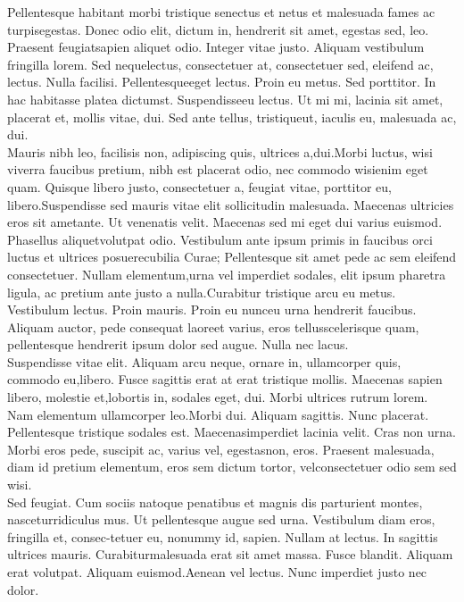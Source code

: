 \documentclass[11pt,
               a4paper,
               parskip=half,
               ]{scrartcl}
\begin{document}
 Pellentesque habitant morbi tristique senectus et netus et malesuada fames ac turpisegestas. Donec odio elit, dictum in, hendrerit sit amet, egestas sed, leo. Praesent feugiatsapien aliquet odio. Integer vitae justo. Aliquam vestibulum fringilla lorem. Sed nequelectus, consectetuer at, consectetuer sed, eleifend ac, lectus. Nulla facilisi. Pellentesqueeget lectus. Proin eu metus. Sed porttitor. In hac habitasse platea dictumst. Suspendisseeu lectus. Ut mi mi, lacinia sit amet, placerat et, mollis vitae, dui. Sed ante tellus, tristiqueut, iaculis eu, malesuada ac, dui. \\
 
 Mauris nibh leo, facilisis non, adipiscing quis, ultrices a,dui.Morbi luctus, wisi viverra faucibus pretium, nibh est placerat odio, nec commodo wisienim eget quam. Quisque libero justo, consectetuer a, feugiat vitae, porttitor eu, libero.Suspendisse sed mauris vitae elit sollicitudin malesuada. Maecenas ultricies eros sit ametante. Ut venenatis velit. Maecenas sed mi eget dui varius euismod. Phasellus aliquetvolutpat odio. Vestibulum ante ipsum primis in faucibus orci luctus et ultrices posuerecubilia Curae; Pellentesque sit amet pede ac sem eleifend consectetuer. Nullam elementum,urna vel imperdiet sodales, elit ipsum pharetra ligula, ac pretium ante justo a nulla.Curabitur tristique arcu eu metus. Vestibulum lectus. Proin mauris. Proin eu nunceu urna hendrerit faucibus. Aliquam auctor, pede consequat laoreet varius, eros tellusscelerisque quam, pellentesque hendrerit ipsum dolor sed augue. Nulla nec lacus.\\
 
 Suspendisse vitae elit. Aliquam arcu neque, ornare in, ullamcorper quis, commodo eu,libero. Fusce sagittis erat at erat tristique mollis. Maecenas sapien libero, molestie et,lobortis in, sodales eget, dui. Morbi ultrices rutrum lorem. Nam elementum ullamcorper leo.Morbi dui. Aliquam sagittis. Nunc placerat. Pellentesque tristique sodales est. Maecenasimperdiet lacinia velit. Cras non urna. Morbi eros pede, suscipit ac, varius vel, egestasnon, eros. Praesent malesuada, diam id pretium elementum, eros sem dictum tortor, velconsectetuer odio sem sed wisi.\\
 
 Sed feugiat. Cum sociis natoque penatibus et magnis dis parturient montes, nasceturridiculus mus. Ut pellentesque augue sed urna. Vestibulum diam eros, fringilla et, consec-tetuer eu, nonummy id, sapien. Nullam at lectus. In sagittis ultrices mauris. Curabiturmalesuada erat sit amet massa. Fusce blandit. Aliquam erat volutpat. Aliquam euismod.Aenean vel lectus. Nunc imperdiet justo nec dolor.\\
 
\end{document}
